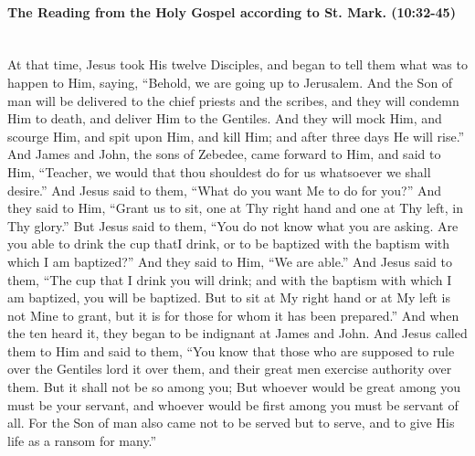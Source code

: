 \documentclass[twoside, letterpaper, 12pt]{report}
\begin{document}


\paragraph{The Reading from the Holy Gospel according to St. Mark. (10:32-45)}\mbox{}\\

At that time, Jesus took His twelve Disciples, and began to tell them what was to happen to Him,
saying, “Behold, we are going up to Jerusalem.
And the Son of man will be delivered to the chief priests and the scribes,
and they will condemn Him to death, and deliver Him to the Gentiles.
And they will mock Him, and scourge Him, and spit upon Him, and kill Him;
and after three days He will rise.”
And James and John, the sons of Zebedee, came forward to Him, and said to Him,
“Teacher, we would that thou shouldest do for us whatsoever we shall desire.”
And Jesus said to them, “What do you want Me to do for you?” And they said to Him,
“Grant us to sit, one at Thy right hand and one at Thy left, in Thy glory.”
But Jesus said to them, “You do not know what you are asking.
Are you able to drink the cup thatI drink,
or to be baptized with the baptism with which I am baptized?”
And they said to Him, “We are able.”
And Jesus said to them, “The cup that I drink you will drink;
and with the baptism with which I am baptized, you will be baptized.
But to sit at My right hand or at My left is not Mine to grant,
but it is for those for whom it has been prepared.”
And when the ten heard it, they began to be indignant at James and John.
And Jesus called them to Him and said to them,
“You know that those who are supposed to rule over the Gentiles lord it over them,
and their great men exercise authority over them.
But it shall not be so among you; But whoever would be great among you must be your servant,
and whoever would be first among you must be servant of all.
For the Son of man also came not to be served but to serve,
and to give His life as a ransom for many.”
\end{document}
